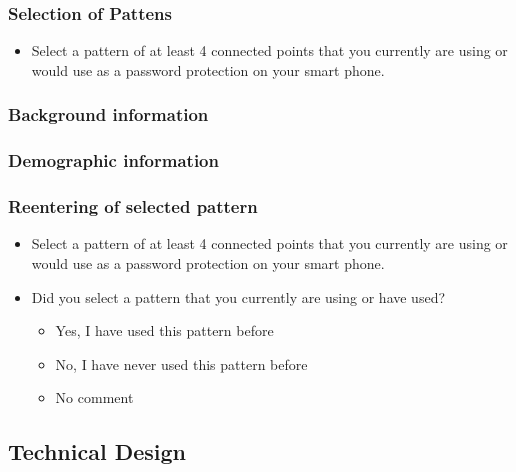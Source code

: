     \subsubsection*{Selection of Pattens}
        \begin{itemize}
            \item  Select a pattern of at least 4 connected points that you currently are using or would use as a password protection on your smart phone. 
        \end{itemize}
    \subsubsection*{Background information}
    \subsubsection*{Demographic information} 
    \subsubsection*{Reentering of selected pattern}
        \begin{itemize}
            \item Select a pattern of at least 4 connected points that you currently are using or would use as a password protection on your smart phone. 
            \item Did you select a pattern that you currently are using or have used?
                \begin{itemize}
                    \item Yes, I have used this pattern before
                    \item No, I have never used this pattern before
                    \item No comment
                \end{itemize}
        \end{itemize}


  \subsection{Technical Design}

